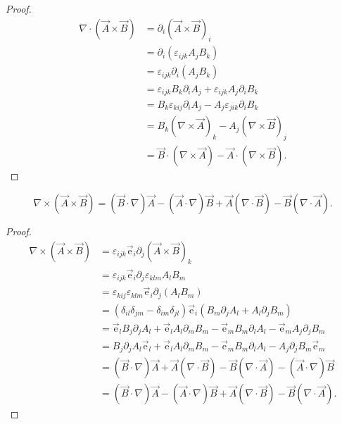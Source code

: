 \begin{proof}
\begin{equation}
\begin{split}
\nabla\cdot \left(\vec{A}\times\vec{B} \right)
&=\partial_i \left(\vec{A}\times\vec{B}\right)_i \\
&=\partial_i (\varepsilon_{ijk} A_j B_k) \\
&=\varepsilon_{ijk}\partial_i ( A_j B_k) \\
&=\varepsilon_{ijk} B_k\partial_i A_j + \varepsilon_{ijk} A_j \partial_i B_k \\
&=B_k \varepsilon_{kij} \partial_i A_j - A_j \varepsilon_{jik} \partial_i B_k \\
&=B_k \left(\nabla\times \vec{A}\right)_k - A_j \left(\nabla\times \vec{B}\right)_j \\
&=\vec{B}\cdot\left(\nabla\times \vec{A}\right) - \vec{A}\cdot\left(\nabla\times\vec{B}\right).
\end{split}
\end{equation}
\end{proof}

\begin{example}
\begin{equation}
\nabla\times\left(\vec{A}\times\vec{B}\right)
=\left(\vec{B}\cdot\nabla\right)\vec{A} - \left(\vec{A}\cdot\nabla\right) \vec{B} + \vec{A}\left(\nabla\cdot\vec{B}\right) - \vec{B}\left(\nabla\cdot\vec{A}\right).
\end{equation}
\end{example}

\begin{proof}
\begin{equation}
\begin{split}
\nabla\times\left(\vec{A}\times\vec{B}\right)
&=\varepsilon_{ijk} \vec{\mathrm{e}}_i \partial_j \left(\vec{A}\times\vec{B}\right)_k \\
&=\varepsilon_{ijk} \vec{\mathrm{e}}_i \partial_j \varepsilon_{klm} A_l B_m \\
&=\varepsilon_{kij} \varepsilon_{klm} \vec{\mathrm{e}}_i \partial_j (A_l B_m) \\
&=(\delta_{il}\delta_{jm}-\delta_{im}\delta_{jl}) \vec{\mathrm{e}}_i (B_m\partial_j A_l + A_l\partial_j B_m) \\
&=\vec{\mathrm{e}}_l B_j\partial_j A_l + \vec{\mathrm{e}}_l A_l \partial_m B_m - \vec{\mathrm{e}}_m B_m \partial_l A_l - \vec{\mathrm{e}}_m A_j\partial_j B_m \\
&= B_j\partial_j A_l\vec{\mathrm{e}}_l + \vec{\mathrm{e}}_l A_l \partial_m B_m - \vec{\mathrm{e}}_m B_m \partial_l A_l -  A_j\partial_j B_m \vec{\mathrm{e}}_m \\
&=\left(\vec{B}\cdot\nabla\right)\vec{A} + \vec{A}\left(\nabla\cdot\vec{B}\right) - \vec{B}\left(\nabla\cdot\vec{A}\right) - \left(\vec{A}\cdot\nabla\right) \vec{B} \\
&=\left(\vec{B}\cdot\nabla\right)\vec{A} - \left(\vec{A}\cdot\nabla\right) \vec{B} + \vec{A}\left(\nabla\cdot\vec{B}\right) - \vec{B}\left(\nabla\cdot\vec{A}\right).
\end{split}
\end{equation}
\end{proof}

